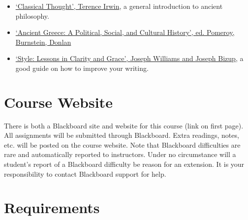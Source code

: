 \documentclass[article,oneside]{memoir}
\begin{document}
\begin{itemize}
\item \href{https://www.amazon.com/Classical-Thought-History-Western-Philosophy/dp/0192891774/ref=sr_1_1?s=books&ie=UTF8&qid=1515009994&sr=1-1&keywords=classical+thought}{`Classical Thought', Terence Irwin}, a general introduction to ancient philosophy.

\item \href{https://a.co/d/fxAx3Gk}{`Ancient Greece: A Political, Social, and Cultural History', ed. Pomeroy, Burnstein, Donlan} 

\item \href{http://www.amazon.com/Style-Lessons-Clarity-Grace-11th/dp/0321898680/ref=sr_1_1?ie=UTF8&qid=1452356026&sr=8-1&keywords=lessons+in+clarity+and+grace}{`Style: Lessons in Clarity and Grace', Joseph Williams and Joseph Bizup}, a good guide on how to improve your writing. 


\end{itemize}
\section{Course Website}
There is both a Blackboard site and website for this course (link on first page). All assignments will be submitted through Blackboard. Extra readings, notes, etc. will be posted on the course website. Note that Blackboard difficulties are rare and automatically reported to instructors. Under no circumstance will a student's report of a Blackboard difficulty be reason for an extension. It is your responsibility to contact Blackboard support for help.


\section{Requirements}
\end{document}
